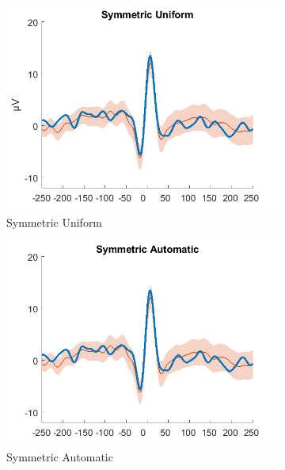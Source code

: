 \documentclass[a4paper]{article}
\begin{document}
\begin{figure}[hbtp]
    \begin{subfigure}{0.245\textwidth}
        \includegraphics[width=\textwidth]{./img/eva/ecg_td_Symmetric_Uniform.png}
        \caption{Symmetric Uniform}\label{fig:td_symuniform}
    \end{subfigure}
    \begin{subfigure}{0.245\textwidth}
        \includegraphics[width=\textwidth]{./img/eva/ecg_td_Symmetric_Automatic.png}
        \caption{Symmetric Automatic}\label{fig:td_symauto}
    \end{subfigure}
    \begin{subfigure}{0.245\textwidth}

\end{subfigure}
\end{figure}
\end{document}
